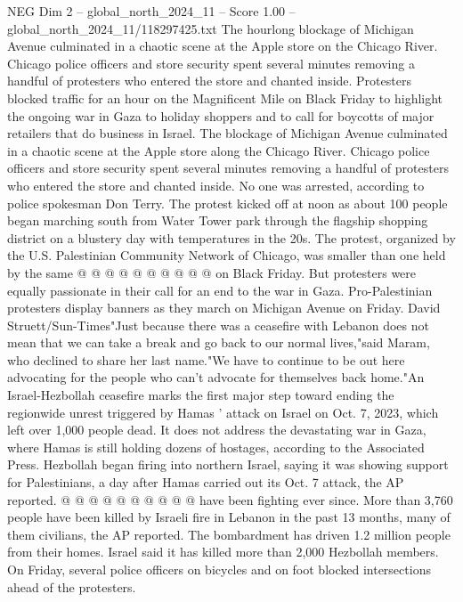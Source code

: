 \begin{textsample}{NEG Dim 2 – global\_north\_2024\_11 – Score 1.00 – global\_north\_2024\_11/118297425.txt}  \label{ex:f2_neg_190}
The hourlong blockage of Michigan Avenue culminated in a chaotic scene at the Apple store on the Chicago River.
Chicago police officers and store security spent several minutes removing a handful of protesters who entered the store and chanted inside.
Protesters blocked traffic for an hour on the Magnificent Mile on Black Friday to highlight the ongoing war in Gaza to holiday shoppers and to call for boycotts of major retailers that do business in Israel.
The blockage of Michigan Avenue culminated in a chaotic scene at the Apple store along the Chicago River.
Chicago police officers and store security spent several minutes removing a handful of protesters who entered the store and chanted inside.
No one was arrested, according to police spokesman Don Terry.
The protest kicked off at noon as about 100 people began marching south from Water Tower park through the flagship shopping district on a blustery day with temperatures in the 20s.
The protest, organized by the U.S.
Palestinian Community Network of Chicago, was smaller than one held by the same @ @ @ @ @ @ @ @ @ @ on Black Friday.
But protesters were equally passionate in their call for an end to the war in Gaza.
Pro-Palestinian protesters display banners as they march on Michigan Avenue on Friday.
David Struett/Sun-Times"Just because there was a ceasefire with Lebanon does not mean that we can take a break and go back to our normal lives,"said Maram, who declined to share her last name."We have to continue to be out here advocating for the people who can't advocate for themselves back home."An Israel-Hezbollah ceasefire marks the first major step toward ending the regionwide unrest triggered by Hamas ' attack on Israel on Oct. 7, 2023, which left over 1,000 people dead.
It does not address the devastating war in Gaza, where Hamas is still holding dozens of hostages, according to the Associated Press.
Hezbollah began firing into northern Israel, saying it was showing support for Palestinians, a day after Hamas carried out its Oct. 7 attack, the AP reported. @ @ @ @ @ @ @ @ @ @ have been fighting ever since.
More than 3,760 people have been killed by Israeli fire in Lebanon in the past 13 months, many of them civilians, the AP reported.
The bombardment has driven 1.2 million people from their homes.
Israel said it has killed more than 2,000 Hezbollah members.
On Friday, several police officers on bicycles and on foot blocked intersections ahead of the protesters.

\end{textsample}
